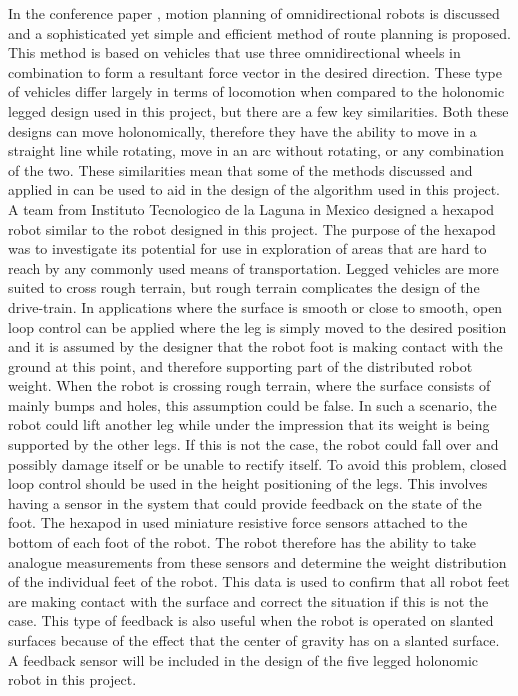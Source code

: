 In the conference paper \cite{Jain:Odometry}, motion planning of omnidirectional robots is discussed and a sophisticated yet simple and efficient method of route planning is proposed. This method is based on vehicles that use three omnidirectional wheels in combination to form a resultant force vector in the desired direction. These type of vehicles differ largely in terms of locomotion when compared to the holonomic legged design used in this project, but there are a few key similarities. Both these designs can move holonomically, therefore they have the ability to move in a straight line while rotating, move in an arc without rotating, or any combination of the two. These similarities mean that some of the methods discussed and applied in \cite{Jain:Odometry} can be used to aid in the design of the algorithm used in this project.\\

A team from Instituto Tecnologico de la Laguna in Mexico designed a hexapod robot \cite{Ollervides:Navigation} similar to the robot designed in this project. The purpose of the hexapod was to investigate its potential for use in exploration of areas that are hard to reach by any commonly used means of transportation. Legged vehicles are more suited to cross rough terrain, but rough terrain complicates the design of the drive-train. In applications where the surface is smooth or close to smooth, open loop control can be applied where the leg is simply moved to the desired position and it is assumed by the designer that the robot foot is making contact with the ground at this point, and therefore supporting part of the distributed robot weight. When the robot is crossing rough terrain, where the surface consists of mainly bumps and holes, this assumption could be false. In such a scenario, the robot could lift another leg while under the impression that its weight is being supported by the other legs. If this is not the case, the robot could fall over and possibly damage itself or be unable to rectify itself. To avoid this problem, closed loop control should be used in the height positioning of the legs. This involves having a sensor in the system that could provide feedback on the state of the foot. The hexapod in \cite{Ollervides:Navigation} used miniature resistive force sensors attached to the bottom of each foot of the robot. The robot therefore has the ability to take analogue measurements from these sensors and determine the weight distribution of the individual feet of the robot. This data is used to confirm that all robot feet are making contact with the surface and correct the situation if this is not the case. This type of feedback is also useful when the robot is operated on slanted surfaces because of the effect that the center of gravity has on a slanted surface. A feedback sensor will be included in the design of the five legged holonomic robot in this project.\\

